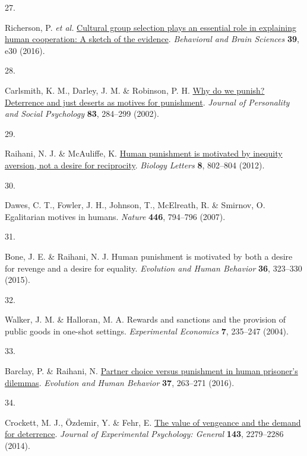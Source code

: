 \documentclass[
  man,floatsintext]{apa6}
\newlength{\cslhangindent}
\newlength{\csllabelwidth}
\newlength{\cslentryspacingunit} %
\newenvironment{CSLReferences}[2] %
 {%
  \setlength{\parindent}{0pt}
  \ifodd #1
  \let\oldpar\par
  \def\par{\hangindent=\cslhangindent\oldpar}
  \fi
  \setlength{\parskip}{#2\cslentryspacingunit}
 }%
 {}
\newcommand{\CSLLeftMargin}[1]{\parbox[t]{\csllabelwidth}{#1}}
\newcommand{\CSLRightInline}[1]{\parbox[t]{\linewidth - \csllabelwidth}{#1}\break}
\begin{document}
\begin{CSLReferences}{0}{0}
\leavevmode{}%
\CSLLeftMargin{27. }%
\CSLRightInline{Richerson, P. \emph{et al.} \href{https://doi.org/10.1017/S0140525X1400106X}{Cultural group selection plays an essential role in explaining human cooperation: A sketch of the evidence}. \emph{Behavioral and Brain Sciences} \textbf{39}, e30 (2016).}

\leavevmode{}%
\CSLLeftMargin{28. }%
\CSLRightInline{Carlsmith, K. M., Darley, J. M. \& Robinson, P. H. \href{https://doi.org/10.1037/0022-3514.83.2.284}{Why do we punish? Deterrence and just deserts as motives for punishment}. \emph{Journal of Personality and Social Psychology} \textbf{83}, 284--299 (2002).}

\leavevmode{}%
\CSLLeftMargin{29. }%
\CSLRightInline{Raihani, N. J. \& McAuliffe, K. \href{https://doi.org/10.1098/rsbl.2012.0470}{Human punishment is motivated by inequity aversion, not a desire for reciprocity}. \emph{Biology Letters} \textbf{8}, 802--804 (2012).}

\leavevmode{}%
\CSLLeftMargin{30. }%
\CSLRightInline{Dawes, C. T., Fowler, J. H., Johnson, T., McElreath, R. \& Smirnov, O. Egalitarian motives in humans. \emph{Nature} \textbf{446}, 794--796 (2007).}

\leavevmode{}%
\CSLLeftMargin{31. }%
\CSLRightInline{Bone, J. E. \& Raihani, N. J. Human punishment is motivated by both a desire for revenge and a desire for equality. \emph{Evolution and Human Behavior} \textbf{36}, 323--330 (2015).}

\leavevmode{}%
\CSLLeftMargin{32. }%
\CSLRightInline{Walker, J. M. \& Halloran, M. A. Rewards and sanctions and the provision of public goods in one-shot settings. \emph{Experimental Economics} \textbf{7}, 235--247 (2004).}

\leavevmode{}%
\CSLLeftMargin{33. }%
\CSLRightInline{Barclay, P. \& Raihani, N. \href{https://doi.org/10.1016/j.evolhumbehav.2015.12.004}{Partner choice versus punishment in human prisoner's dilemmas}. \emph{Evolution and Human Behavior} \textbf{37}, 263--271 (2016).}

\leavevmode{}%
\CSLLeftMargin{34. }%
\CSLRightInline{Crockett, M. J., Özdemir, Y. \& Fehr, E. \href{https://doi.org/10.1037/xge0000018}{The value of vengeance and the demand for deterrence}. \emph{Journal of Experimental Psychology: General} \textbf{143}, 2279--2286 (2014).}


\end{CSLReferences}
\end{document}
